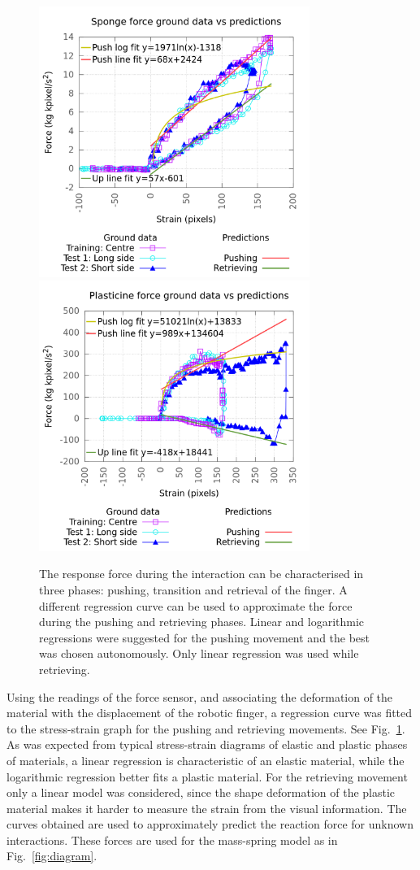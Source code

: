 \documentclass[journal]{IEEEtran}
\newcommand{\fref}[1]{Fig.~\ref{#1}}
\begin{document}
\begin{figure}[!t]
\centering
\includegraphics[width=88mm]{arrio4}
\includegraphics[width=88mm]{arrio5}
\caption{The response force during the interaction can be characterised in three phases: pushing, transition and retrieval of the finger.  A different regression curve can be used to approximate the force during the pushing and retrieving phases.  Linear and logarithmic regressions were suggested for the pushing movement and the best was chosen autonomously.  Only linear regression was used while retrieving.}\label{fig:sstrain}
\end{figure}

Using the readings of the force sensor, and associating the deformation of the material with the displacement of the robotic finger, a regression curve was fitted to the stress-strain graph for the pushing and retrieving movements.  See \fref{fig:sstrain}.  As was expected from typical stress-strain diagrams of elastic and plastic phases of materials, a linear regression is characteristic of an elastic material, while the logarithmic regression better fits a plastic material.  For the retrieving movement only a linear model was considered, since the shape deformation of the plastic material makes it harder to measure the strain from the visual information.  The curves obtained are used to approximately predict the reaction force for unknown interactions.  These forces are used for the mass-spring model as in \fref{fig:diagram}.
\end{document}

